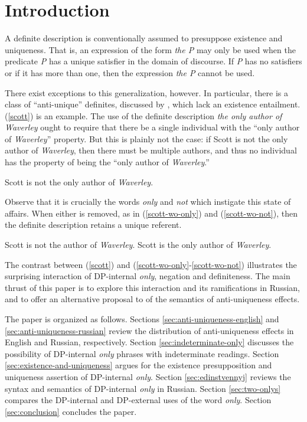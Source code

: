 \section{Introduction \label{sec:intro}}
A definite description is conventionally assumed to presuppose existence and uniqueness. That is, an expression of the form \textit{the P} may only be used when the predicate \textit{P} has a unique satisfier in the domain of discourse. If \textit{P} has no satisfiers or if it has more than one, then the expression \textit{the P} cannot be used.

There exist exceptions to this generalization, however. In particular, there is a class of ``anti-unique'' definites, discussed by \citet{cb2015}, which lack an existence entailment. (\ref{scott}) is an example. The use of the definite description \textit{the only author of Waverley} ought to require that there be a single individual with the ``only author of \textit{Waverley}'' property. But this is plainly not the case: if Scott is not the only author of \textit{Waverley}, then there must be multiple authors, and thus no individual has the property of being the ``only author of \textit{Waverley}.''

\begin{exe}
	\ex \label{scott} Scott is not the only author of \textit{Waverley}.
\end{exe}

Observe that it is crucially the words \textit{only} and \textit{not} which instigate this state of affairs. When either is removed, as in (\ref{scott-wo-only}) and (\ref{scott-wo-not}), then the definite description retains a unique referent.

\begin{exe}
	\ex \label{scott-wo-only} Scott is not the author of \textit{Waverley}.
	\ex \label{scott-wo-not} Scott is the only author of \textit{Waverley}.
\end{exe}

The contrast between (\ref{scott}) and (\ref{scott-wo-only}-\ref{scott-wo-not}) illustrates the surprising interaction of DP-internal \textit{only}, negation and definiteness. The main thrust of this paper is to explore this interaction and its ramifications in Russian, and to offer an alternative proposal to  of the semantics of anti-uniqueness effects.

The paper is organized as follows. Sections \ref{sec:anti-uniqueness-english} and \ref{sec:anti-uniqueness-russian} review the distribution of anti-uniqueness effects in English and Russian, respectively. Section \ref{sec:indeterminate-only} discusses the possibility of DP-internal \textit{only} phrases with indeterminate readings. Section \ref{sec:existence-and-uniqueness} argues for the existence presupposition and uniqueness assertion of DP-internal \textit{only}. Section \ref{sec:edinstvennyj} reviews the syntax and semantics of DP-internal \textit{only} in Russian. Section \ref{sec:two-onlys} compares the DP-internal and DP-external uses of the word \textit{only}. Section \ref{sec:conclusion} concludes the paper.